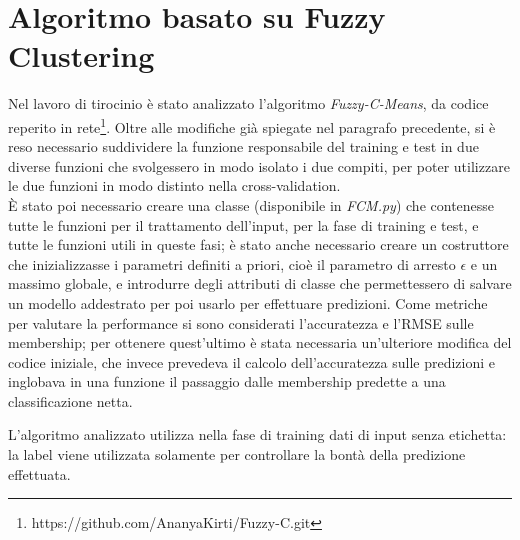 \documentclass[oneside, openany]{book}
\begin{document}
	\section{Algoritmo basato su Fuzzy Clustering}
	Nel lavoro di tirocinio è stato analizzato l'algoritmo \textit{Fuzzy-C-Means}, da codice reperito in rete\footnote{https://github.com/AnanyaKirti/Fuzzy-C.git}. Oltre alle modifiche già spiegate nel paragrafo precedente, si è reso necessario suddividere la funzione responsabile del training e test in due diverse funzioni che svolgessero in modo isolato i due compiti, per poter utilizzare le due funzioni in modo distinto nella cross-validation.\\
	\`E stato poi necessario creare una classe (disponibile in \textit{FCM.py}) che contenesse tutte le funzioni per il trattamento dell'input, per la fase di training e test, e tutte le funzioni utili in queste fasi; è stato anche necessario creare un costruttore che inizializzasse i parametri definiti a priori, cioè il parametro di arresto $\epsilon$ e un massimo globale, e introdurre degli attributi di classe che permettessero di salvare un modello addestrato per poi usarlo per effettuare predizioni.
	Come metriche per valutare la performance si sono considerati l'accuratezza e l'RMSE sulle membership; per ottenere quest'ultimo è stata necessaria un'ulteriore modifica del codice iniziale, che invece prevedeva il calcolo dell'accuratezza sulle predizioni e inglobava in una funzione il passaggio dalle membership predette a una classificazione netta.
	
	L'algoritmo analizzato utilizza nella fase di training dati di input senza etichetta: la label viene utilizzata solamente per controllare la bontà della predizione effettuata.
	
\end{document}
